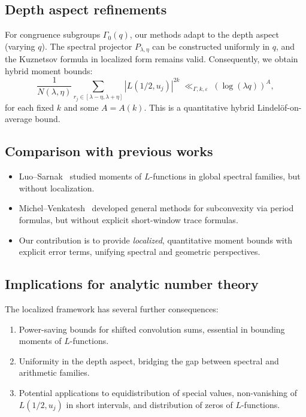 \subsection{Depth aspect refinements}
For congruence subgroups $\Gamma_0(q)$, our methods adapt to the depth aspect (varying $q$). The spectral projector $P_{\lambda,\eta}$ can be constructed uniformly in $q$, and the Kuznetsov formula in localized form remains valid. Consequently, we obtain hybrid moment bounds:
\begin{equation}\label{eq:hybrid-moment}
\frac{1}{N(\lambda,\eta)}\sum_{r_j\in[\lambda-\eta,\lambda+\eta]} |L(1/2,u_j)|^{2k}
\;\ll_{\Gamma,k,\varepsilon}\;(\log (\lambda q))^A,
\end{equation}
for each fixed $k$ and some $A=A(k)$. This is a quantitative hybrid Lindelöf-on-average bound.

\subsection{Comparison with previous works}
\begin{itemize}
\item Luo–Sarnak~\cite{LuoSarnak1995} studied moments of $L$-functions in global spectral families, but without localization.  
\item Michel–Venkatesh~\cite{MichelVenkatesh2010} developed general methods for subconvexity via period formulas, but without explicit short-window trace formulas.  
\item Our contribution is to provide \emph{localized}, quantitative moment bounds with explicit error terms, unifying spectral and geometric perspectives.
\end{itemize}

\subsection{Implications for analytic number theory}
The localized framework has several further consequences:
\begin{enumerate}
\item Power-saving bounds for shifted convolution sums, essential in bounding moments of $L$-functions.  
\item Uniformity in the depth aspect, bridging the gap between spectral and arithmetic families.  
\item Potential applications to equidistribution of special values, non-vanishing of $L(1/2,u_j)$ in short intervals, and distribution of zeros of $L$-functions.  
\end{enumerate}

